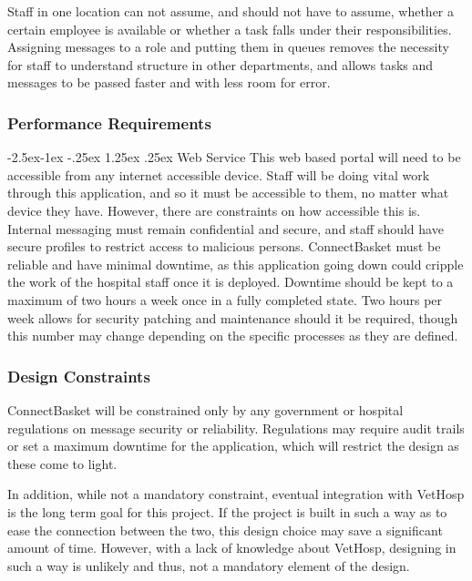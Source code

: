 \documentclass[onecolumn, draftclsnofoot,10pt, compsoc]{IEEEtran}
\makeatletter
\renewcommand\paragraph{\@startsection{paragraph}{4}{\z@}%
            {-2.5ex\@plus -1ex \@minus -.25ex}%
            {1.25ex \@plus .25ex}%
            {\normalfont\normalsize\bfseries}}
\makeatother
\begin{document}
Staff in one location can not assume, and should not have to assume, whether a certain employee is available or whether a task falls under their responsibilities. Assigning messages to a role and putting them in queues removes the necessity for staff to understand structure in other departments, and allows tasks and messages to be passed faster and with less room for error.

\subsubsection{Performance Requirements}

\paragraph{Web Service}
This web based portal will need to be accessible from any internet accessible device. Staff will be doing vital work through this application, and so it must be accessible to them, no matter what device they have. However, there are constraints on how accessible this is. Internal messaging must remain confidential and secure, and staff should have secure profiles to restrict access to malicious persons. ConnectBasket must be reliable and have minimal downtime, as this application going down could cripple the work of the hospital staff once it is deployed. Downtime should be kept to a maximum of two hours a week once in a fully completed state. Two hours per week allows for security patching and maintenance should it be required, though this number may change depending on the specific processes as they are defined.

\subsubsection{Design Constraints}
ConnectBasket will be constrained only by any government or hospital regulations on message security or reliability. Regulations may require audit trails or set a maximum downtime for the application, which will restrict the design as these come to light.

In addition, while not a mandatory constraint, eventual integration with VetHosp is the long term goal for this project. If the project is built in such a way as to ease the connection between the two, this design choice may save a significant amount of time. However, with a lack of knowledge about VetHosp, designing in such a way is unlikely and thus, not a mandatory element of the design.
\end{document}
